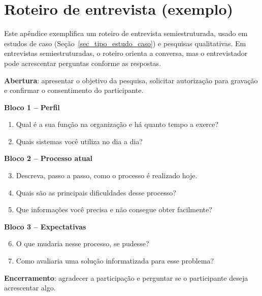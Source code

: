 \chapter{Roteiro de entrevista (exemplo)}
\label{apD_roteiro}

Este apêndice exemplifica um roteiro de entrevista semiestruturada, usado em estudos de caso (Seção~\ref{sec_tipo_estudo_caso}) e pesquisas qualitativas. Em entrevistas semiestruturadas, o roteiro orienta a conversa, mas o entrevistador pode acrescentar perguntas conforme as respostas.

\textbf{Abertura}: apresentar o objetivo da pesquisa, solicitar autorização para gravação e confirmar o consentimento do participante.

\textbf{Bloco 1 -- Perfil}

\begin{enumerate}
	\item Qual é a sua função na organização e há quanto tempo a exerce?
	\item Quais sistemas você utiliza no dia a dia?
\end{enumerate}

\textbf{Bloco 2 -- Processo atual}

\begin{enumerate}
	\setcounter{enumi}{2}
	\item Descreva, passo a passo, como o processo é realizado hoje.
	\item Quais são as principais dificuldades desse processo?
	\item Que informações você precisa e não consegue obter facilmente?
\end{enumerate}

\textbf{Bloco 3 -- Expectativas}

\begin{enumerate}
	\setcounter{enumi}{5}
	\item O que mudaria nesse processo, se pudesse?
	\item Como avaliaria uma solução informatizada para esse problema?
\end{enumerate}

\textbf{Encerramento}: agradecer a participação e perguntar se o participante deseja acrescentar algo.
